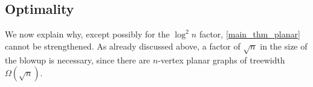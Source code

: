 \documentclass{patmorin}
\DeclareMathOperator{\polylog}{polylog}
\begin{document}
\subsection{Optimality}
\label{optimality}

We now explain why, except possibly for the $\log^2 n$ factor, \cref{main_thm_planar} cannot be strengthened.  As already discussed above, a factor of $\sqrt{n}$ in the size of the blowup is necessary, since there are $n$-vertex planar graphs of treewidth $\Omega(\sqrt{n})$.



\end{document}
